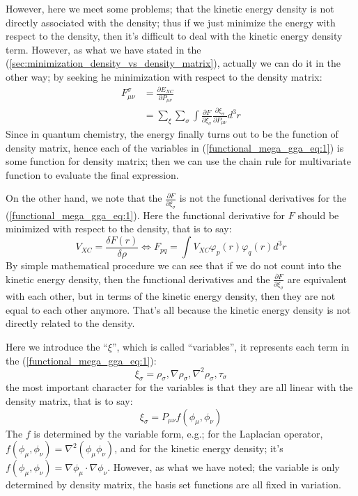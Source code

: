 However, here we meet some problems; that the kinetic energy density
is not directly associated with the density; thus if we just minimize
the energy with respect to the density, then it's difficult to deal
with the kinetic energy density term. However, as what we have stated
in the (\ref{sec:minimization_density_vs_density_matrix}), actually
we can do it in the other way; by seeking he minimization with
respect to the density matrix:
\begin{align}
\label{functional_mega_gga_eq:3}
F_{\mu\nu}^{\sigma}  &= \frac{\partial E_{XC}}{\partial P_{\mu\nu}}
\nonumber \\
  &= \sum_{\xi}\sum_{\sigma}\int \frac{\partial F}{\partial
\xi_{\sigma}} \frac{\partial \xi_{\sigma}}{\partial P_{\mu\nu}}
d^{3}r 
\end{align}
Since in quantum chemistry, the energy finally turns out to be the
function of density matrix, hence each of the variables in
(\ref{functional_mega_gga_eq:1}) is some function for density matrix;
then we can use the chain rule for multivariate function to evaluate
the final expression.

On the other hand, we note that the $\frac{\partial
F}{\partial \xi_{\sigma}}$ is not the functional derivatives for the 
(\ref{functional_mega_gga_eq:1}). Here the functional derivative for
$F$ should be minimized with respect to the density, that is to say:
\begin{equation}
 \label{not_the_functional_derivatives}
V_{XC} = \frac{\delta F(r)}{\delta \rho} \Leftrightarrow F_{pq} = \int V_{XC}
\varphi_{p}(r)\varphi_{q}(r) d^{3} r
\end{equation}
By simple mathematical procedure we can see that if we do not count into the
kinetic energy density, then the functional derivatives and the $\frac{\partial
F}{\partial \xi_{\sigma}}$ are equivalent with each other, but in terms of the
kinetic energy density, then they are not equal to each other anymore.
That's all because the kinetic energy density is not directly related to the
density.

Here we introduce the ``$\xi$'', which is called ``variables'', it
represents each term in the (\ref{functional_mega_gga_eq:1}):
\begin{equation}
\label{functional_mega_gga_eq:4}
 \xi_{\sigma} = \rho_{\sigma}, \nabla\rho_{\sigma},
\nabla^{2}\rho_{\sigma}, \tau_{\sigma}
\end{equation} 
the most important character for the variables is that they are all
linear with the density matrix, that is to say:
\begin{equation}
 \label{functional_mega_gga_eq:5}
\xi_{\sigma} = P_{\mu\nu}f(\phi_{\mu},\phi_{\nu})
\end{equation} 
The $f$ is determined by the variable form, e.g.; for the Laplacian
operator, $f(\phi_{\mu},\phi_{\nu}) =
\nabla^{2}(\phi_{\mu}\phi_{\nu})$, and for the kinetic energy
density; it's $f(\phi_{\mu},\phi_{\nu}) =
\nabla\phi_{\mu}\cdotp\nabla\phi_{\nu}$. However, as what we have
noted; the variable is only determined by density matrix, the basis
set functions are all fixed in variation.

